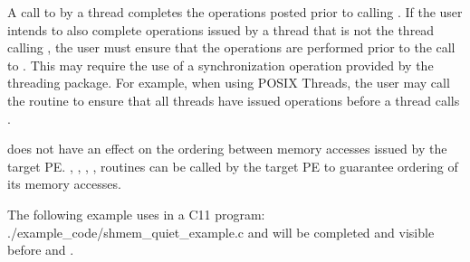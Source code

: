 \begin{apidefinition}
{     A call to  by a thread completes the operations posted prior
     to calling . If the user intends to also complete operations 
     issued by a thread that is not the thread calling , the
     user must ensure that the operations are performed prior to the call to
     . This may require the use of a synchronization
     operation provided by the threading package. For example, when using POSIX
     Threads, the user may call the  routine to
     ensure that all threads have issued operations before a thread calls
     .

     does not have an effect on the ordering between memory 
    accesses issued by the target PE. , , , ,
     routines can be called by the target PE to guarantee 
    ordering of its memory accesses.
}

\begin{apiexamples}

\apicexample
    {The following example uses    in a C11 program: }
    {./example_code/shmem_quiet_example.c}
    { and  will be completed and visible before 
    and .}
\end{apiexamples}

\end{apidefinition}
